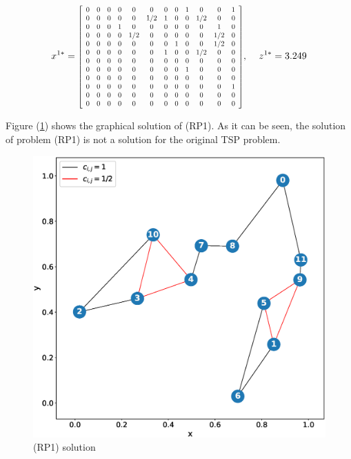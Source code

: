 \documentclass[12pt]{article}
\begin{document}
\begin{equation}
    x^{1*} = 
\resizebox{0.5\linewidth}{!}{$
        \left[ \begin {array}{cccccccccccc} 
        
         0& 0& 0& 0& 0& 0& 0&  0& 1& 0& 0& 1\\
         0&0&0&0&0&1/2&1&0&0&1/2&0&0\\
         0&0&0&1&0&0&0&0&0&0&1&0\\
         0&0&0&0&1/2&0&0&0&0&0&1/2&0\\
         0&0&0&0&0&0&0&1&0&0&1/2&0\\
         0&0&0&0&0&0&1&0&0&1/2&0&0\\
         0&0&0&0&0&0&0&0&0&0&0&0\\
         0&0&0&0&0&0&0&0&1&0&0&0\\
         0&0&0&0&0&0&0&0&0&0&0&0\\
         0&0&0&0&0&0&0&0&0&0&0&1\\
         0&0&0&0&0&0&0&0&0&0&0&0\\
         0&0&0&0&0&0&0&0&0&0&0&0\\
        \end {array}
        \right]     
$}
\text{, } \quad z^{1*} = 3.249
\end{equation}

Figure (\ref{f4}) shows the graphical solution of (RP1). As it can be seen, the solution of problem (RP1) is not a solution for the original TSP problem.

\begin{figure}[H]
\centering
    \includegraphics[width=0.7\linewidth]{f2.eps} 
  \caption{(RP1) solution}
  \label{f4}
\end{figure}
\end{document}
